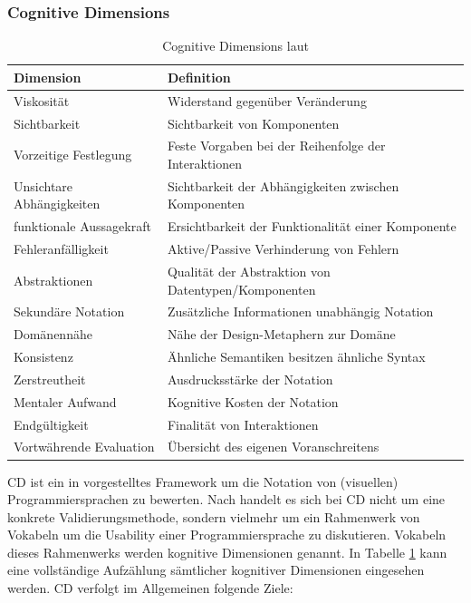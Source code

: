 \subsubsection{Cognitive Dimensions}
\begin{table}[h]
\centering
\begin{tabularx}{\textwidth}{lX}
\hline
\rowcolor[HTML]{EFEFEF} 
Dimension                 & Definition                                           \\ \hline
Viskosität                & Widerstand gegenüber Veränderung                     \\ \hline
Sichtbarkeit              & Sichtbarkeit von Komponenten                         \\ \hline
Vorzeitige Festlegung     & Feste Vorgaben bei der Reihenfolge der Interaktionen \\ \hline
Unsichtare Abhängigkeiten & Sichtbarkeit der Abhängigkeiten zwischen Komponenten \\ \hline
funktionale Aussagekraft  & Ersichtbarkeit der Funktionalität einer Komponente   \\ \hline
Fehleranfälligkeit        & Aktive/Passive Verhinderung von Fehlern              \\ \hline
Abstraktionen             & Qualität der Abstraktion von Datentypen/Komponenten  \\ \hline
Sekundäre Notation        & Zusätzliche Informationen unabhängig Notation        \\ \hline
Domänennähe               & Nähe der Design-Metaphern zur Domäne                 \\ \hline
Konsistenz                & Ähnliche Semantiken besitzen ähnliche Syntax         \\ \hline
Zerstreutheit             & Ausdrucksstärke der Notation                         \\ \hline
Mentaler Aufwand          & Kognitive Kosten der Notation                        \\ \hline
Endgültigkeit             & Finalität von Interaktionen                          \\ \hline
Vortwährende Evaluation   & Übersicht des eigenen Voranschreitens                \\ \hline
\end{tabularx}
\caption{Cognitive Dimensions laut \cite{blackwell2003notational}}
\label{tab:cognitivedimensions}
\end{table}
\acl{CD} ist ein in \cite{blackwell2003notational} vorgestelltes Framework um die Notation von (visuellen) Programmiersprachen zu bewerten. Nach \cite{blackwell2003notational} handelt es sich bei \ac{CD} nicht um eine konkrete Validierungsmethode, sondern vielmehr um ein Rahmenwerk von Vokabeln um die Usability einer Programmiersprache zu diskutieren. Vokabeln dieses Rahmenwerks werden kognitive Dimensionen genannt. In Tabelle \ref{tab:cognitivedimensions} kann eine vollständige Aufzählung sämtlicher kognitiver Dimensionen eingesehen werden. \ac{CD} verfolgt im Allgemeinen folgende Ziele:

